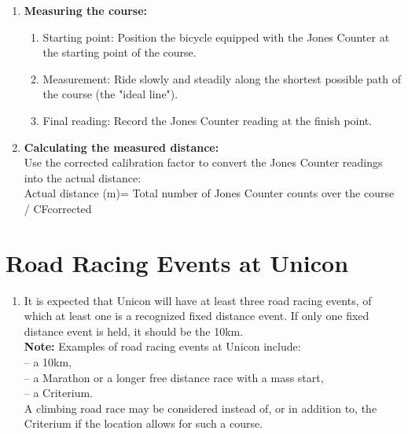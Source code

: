\begin{enumerate}[leftmargin=1.5em,labelsep=*]
\begin{enumerate}[label=\roman*,leftmargin=1.75em,labelsep=*]
\begin{enumerate}[label*=.\roman*,leftmargin=3.25em,labelsep=*]
			Such errors may arise from deviations in the bicycle's path or instability.
			If necessary, repeat the 4 measurements to obtain reliable data.
			\item Calculating the calibration factor (CF):
			Average the valid readings to determine the calibration factor:\\
			CF = Average number of Jones Counter counts over 4 measurements / Length of the calibration course in meters
			\item Applying the correction factor:
			Apply a correction factor of 1.003 to ensure a conservative measurement:\\
			CFcorrected = CF x 1.003
		\end{enumerate}
		\item \textbf{Measuring the course:}
		\begin{enumerate}[label*=.\roman*,leftmargin=3.25em,labelsep=*]
			\item Starting point:
			Position the bicycle equipped with the Jones Counter at the starting point of the course.
			\item Measurement:
			Ride slowly and steadily along the shortest possible path of the course (the "ideal line").
			\item Final reading:
			Record the Jones Counter reading at the finish point.
		\end{enumerate}
		\item \textbf{Calculating the measured distance:}\\
		Use the corrected calibration factor to convert the Jones Counter readings into the actual distance:\\
		Actual distance (m)= Total number of Jones Counter counts over the course / CFcorrected
	\end{enumerate}
\end{enumerate}

\section {Road Racing Events at Unicon}

\begin{enumerate}[leftmargin=1.5em,labelsep=*]
	\item It is expected that Unicon will have at least three road racing events, of which at least one is a recognized fixed distance event.
	If only one fixed distance event is held, it should be the 10km.\\
	\textbf{Note:} Examples of road racing events at Unicon include:\\
	-- a 10km,\\
	-- a Marathon or a longer free distance race with a mass start,\\
	-- a Criterium.\\
	A climbing road race may be considered instead of, or in addition to, the Criterium if the location allows for such a course.
\end{enumerate}
